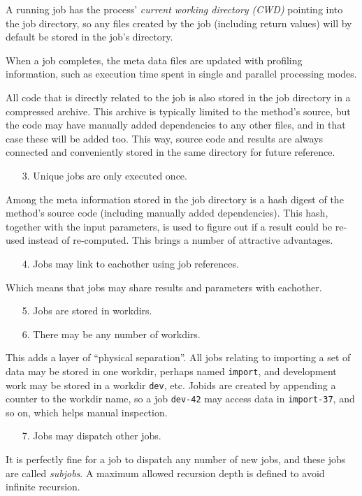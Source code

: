 A running job has the process' \textsl{current working directory
(CWD)} pointing into the job directory, so any files created by the
job (including return values) will by default be stored in the job's
directory.

When a job completes, the meta data files are updated with profiling
information, such as execution time spent in single and parallel
processing modes.

All code that is directly related to the job is also stored in the job
directory in a compressed archive.  This archive is typically limited
to the method's source, but the code may have manually added
dependencies to any other files, and in that case these will be added
too.  This way, source code and results are always connected and
conveniently stored in the same directory for future reference.
\begin{itemize}
\item[3.]  Unique jobs are only executed once.
\end{itemize}
Among the meta information stored in the job directory is a hash
digest of the method's source code (including manually added
dependencies).  This hash, together with the input parameters, is used
to figure out if a result could be re-used instead of re-computed.
This brings a number of attractive advantages.
\begin{itemize}
\item[4.]  Jobs may link to eachother using job references.
\end{itemize}
Which means that jobs may share results and parameters with eachother.
\begin{itemize}
\item[5.]  Jobs are stored in workdirs.
\item[6.]  There may be any number of workdirs.
\end{itemize}
This adds a layer of ``physical separation''.  All jobs relating to
importing a set of data may be stored in one workdir, perhaps named
\texttt{import}, and development work may be stored in a workdir
\texttt{dev}, etc.  Jobids are created by appending a counter to the
workdir name, so a job \texttt{dev-42} may access data in
\texttt{import-37}, and so on, which helps manual inspection.
\begin{itemize}
\item[7.] Jobs may dispatch other jobs.
\end{itemize}
It is perfectly fine for a job to dispatch any number of new jobs, and
these jobs are called \textsl{subjobs}.  A maximum allowed recursion
depth is defined to avoid infinite recursion.



